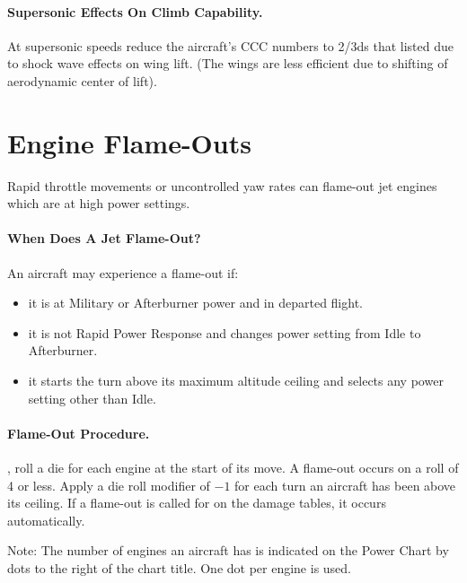 \paragraph{Supersonic Effects On Climb Capability.} At supersonic speeds reduce the aircraft's CCC numbers to 2/3ds that listed due to shock wave effects on wing lift. (The wings are less efficient due to shifting of aerodynamic center of lift).

\section{Engine Flame-Outs}

Rapid throttle movements or uncontrolled yaw rates can flame-out jet engines which are at high power settings.

\paragraph{When Does A Jet Flame-Out?} An aircraft may experience a flame-out if:

\begin{itemize}

    \item it is at Military or Afterburner power and in departed flight.

    \item it is not Rapid Power Response and changes power setting from Idle to Afterburner.

    \item it starts the turn above its maximum altitude ceiling and selects any power setting other than Idle.

\end{itemize}

\paragraph{Flame-Out Procedure.} , roll a die for each engine at the start of its move. A flame-out occurs on a roll of 4 or less. Apply a die roll modifier of $-1$ for each turn an aircraft has been above its ceiling. If a flame-out is called for on the damage tables, it occurs automatically.

Note: The number of engines an aircraft has is indicated on the Power Chart by dots to the right of the chart title. One dot per engine is used.

